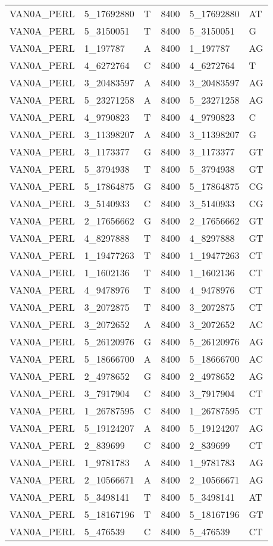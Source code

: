 \begin{center}
\begin{longtable}{|l|l|l|l|l|l|}
VAN0A\_PERL&5\_17692880&T&8400&5\_17692880&AT\\
VAN0A\_PERL&5\_3150051&T&8400&5\_3150051&G\\
VAN0A\_PERL&1\_197787&A&8400&1\_197787&AG\\
VAN0A\_PERL&4\_6272764&C&8400&4\_6272764&T\\
VAN0A\_PERL&3\_20483597&A&8400&3\_20483597&AG\\
VAN0A\_PERL&5\_23271258&A&8400&5\_23271258&AG\\
VAN0A\_PERL&4\_9790823&T&8400&4\_9790823&C\\
VAN0A\_PERL&3\_11398207&A&8400&3\_11398207&G\\
VAN0A\_PERL&3\_1173377&G&8400&3\_1173377&GT\\
VAN0A\_PERL&5\_3794938&T&8400&5\_3794938&GT\\
VAN0A\_PERL&5\_17864875&G&8400&5\_17864875&CG\\
VAN0A\_PERL&3\_5140933&C&8400&3\_5140933&CG\\
VAN0A\_PERL&2\_17656662&G&8400&2\_17656662&GT\\
VAN0A\_PERL&4\_8297888&T&8400&4\_8297888&GT\\
VAN0A\_PERL&1\_19477263&T&8400&1\_19477263&CT\\
VAN0A\_PERL&1\_1602136&T&8400&1\_1602136&CT\\
VAN0A\_PERL&4\_9478976&T&8400&4\_9478976&CT\\
VAN0A\_PERL&3\_2072875&T&8400&3\_2072875&CT\\
VAN0A\_PERL&3\_2072652&A&8400&3\_2072652&AC\\
VAN0A\_PERL&5\_26120976&G&8400&5\_26120976&AG\\
VAN0A\_PERL&5\_18666700&A&8400&5\_18666700&AC\\
VAN0A\_PERL&2\_4978652&G&8400&2\_4978652&AG\\
VAN0A\_PERL&3\_7917904&C&8400&3\_7917904&CT\\
VAN0A\_PERL&1\_26787595&C&8400&1\_26787595&CT\\
VAN0A\_PERL&5\_19124207&A&8400&5\_19124207&AG\\
VAN0A\_PERL&2\_839699&C&8400&2\_839699&CT\\
VAN0A\_PERL&1\_9781783&A&8400&1\_9781783&AG\\
VAN0A\_PERL&2\_10566671&A&8400&2\_10566671&AG\\
VAN0A\_PERL&5\_3498141&T&8400&5\_3498141&AT\\
VAN0A\_PERL&5\_18167196&T&8400&5\_18167196&GT\\
VAN0A\_PERL&5\_476539&C&8400&5\_476539&CT\\

\end{longtable}
\end{center}
